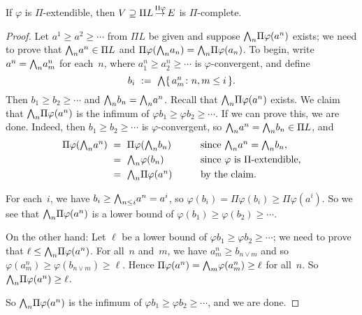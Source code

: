 \documentclass[main.tex]{subfiles}
\begin{document}
\begin{lem}
If $\varphi$ is $\Pi$-extendible,
then $V \supseteq \Pi L\,\smash{\stackrel{\Pi\varphi}{\rightarrow}}\,E$ is $\Pi$-complete.
\end{lem}
\begin{proof}
Let $a^1 \geq a^2 \geq \dotsb $ from $\Pi L$
be given and suppose  $\textstyle{\bigwedge}_n \Pi \varphi (a^n)$ exists;
we need to prove that $\textstyle{\bigwedge}_n a^n \in \Pi L$
and $\Pi\varphi(\textstyle{\bigwedge}_n a_n) = \textstyle{\bigwedge}_n \Pi \varphi(a_n )$.
To begin, write
$a^n = \textstyle{\bigwedge}_n a^n_m$
for each~$n$,
where $a^n_1 \geq a^n_2 \geq \dotsb$
is $\varphi$-convergent, and define
\begin{equation*}
b_i \ :=\ \textstyle{\bigwedge}\{\,a^n_m\colon n,m\leq i \,\}.
\end{equation*}
Then $b_1 \geq b_2 \geq \dotsb$
and $\textstyle{\bigwedge}_n b_n = \textstyle{\bigwedge}_n a^n$.
Recall that  $\textstyle{\bigwedge}_n \Pi\varphi(a^n)$
exists.
We claim that $\textstyle{\bigwedge}_n \Pi\varphi(a^n)$
is the infimum of $\varphi b_1 \geq \varphi b_2 \geq \dotsb$.
If we can prove this, we are done.
Indeed,
then $b_1 \geq b_2 \geq\dotsb$ is $\varphi$-convergent,
so $\textstyle{\bigwedge}_n a^n = \textstyle{\bigwedge}_n b_n \in \Pi L$,
and
\begin{alignat*}{3}
\Pi\varphi( \textstyle{\bigwedge}_n a^n ) \ &=\  \Pi\varphi( \textstyle{\bigwedge}_n b_n )
 \qquad&& \text{since $\textstyle{\bigwedge}_n a^n = \textstyle{\bigwedge}_n b_n$}, \\
&=\ \textstyle{\bigwedge}_n \varphi (b_n)  
  && \text{since $\varphi$ is $\Pi$-extendible,}\\
&=\ \textstyle{\bigwedge}_n \Pi\varphi(a^n) 
  && \text{by the claim.}
\end{alignat*}

For each~$i$,
we have $b_i \geq \textstyle{\bigwedge}_{n\leq i} a^n = a^i$,
so $\varphi(b_i) = \Pi\varphi(b_i) \geq \Pi\varphi(a^i)$.
So we see that
$\textstyle{\bigwedge}_n \Pi\varphi(a^n)$ is a lower bound of
$\varphi(b_1)\geq \varphi(b_2) \geq \dotsb$.

On the other hand:
Let $\ell$ be a lower bound of $\varphi b_1 \geq \varphi b_2 \geq \dotsb$;
we need to prove that $\ell \leq \textstyle{\bigwedge}_n \Pi\varphi(a^n)$.
For all~$n$ and~$m$,
we have $a_m^n \geq b_{n\vee m}$
and so $\varphi(a_m^n) \geq \varphi(b_{n\vee m}) \geq \ell$.
Hence $\Pi\varphi(a^n) = \textstyle{\bigwedge}_m \varphi(a_m^n) \geq \ell$
for all~$n$.
So $\textstyle{\bigwedge}_n \Pi\varphi(a^n) \geq \ell$.

So $\textstyle{\bigwedge}_n \Pi\varphi(a^n)$ is the infimum of 
$\varphi b_1 \geq \varphi b_2 \geq \dotsb$,
and we are done.
\end{proof}
\end{document}
